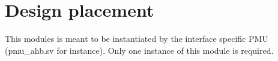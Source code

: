 \section{Design placement}
\label{chapter2}
This modules is meant to be instantiated by the interface specific PMU (pmu\_ahb.sv for instance). Only one instance of this module is required.




